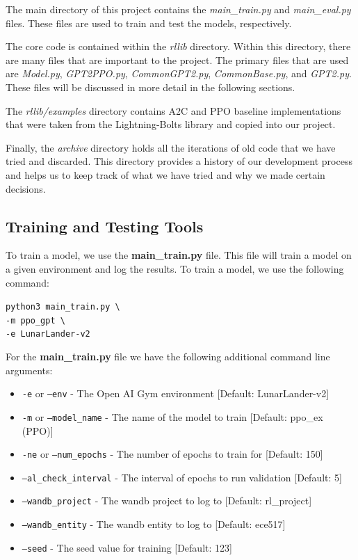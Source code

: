 \documentclass[conference]{IEEEtran}
\begin{document}
The main directory of this project contains the \textit{main\_train.py} and \textit{main\_eval.py} files. These files are used to train and test the models, respectively.

The core code is contained within the \textit{rllib} directory. Within this directory, there are many files that are important to the project. The primary files that are used are \textit{Model.py}, \textit{GPT2PPO.py}, \textit{CommonGPT2.py}, \textit{CommonBase.py}, and \textit{GPT2.py}. These files will be discussed in more detail in the following sections.

The \textit{rllib/examples} directory contains A2C and PPO baseline implementations that were taken from the Lightning-Bolts library and copied into our project.

Finally, the \textit{archive} directory holds all the iterations of old code that we have tried and discarded. This directory provides a history of our development process and helps us to keep track of what we have tried and why we made certain decisions.


\subsection{Training and Testing Tools}
To train a model, we use the \textbf{main\_train.py} file. This file will train a model on a given environment and log the results.
To train a model, we use the following command:
\begin{center}
    \texttt{python3 main\_train.py \textbackslash \\}
    \texttt{-m ppo\_gpt \textbackslash \\}
    \texttt{-e LunarLander-v2}
\end{center}

For the \textbf{main\_train.py} file we have the following additional command line arguments:
\begin{itemize}
    \item \texttt{-e} or \texttt{--env} - The Open AI Gym environment [Default: LunarLander-v2]
    \item \texttt{-m} or \texttt{--model\_name} - The name of the model to train [Default: ppo\_ex (PPO)]
    \item \texttt{-ne} or \texttt{--num\_epochs} - The number of epochs to train for [Default: 150]
    \item \texttt{--al\_check\_interval} - The interval of epochs to run validation [Default: 5]
    \item \texttt{--wandb\_project} - The wandb project to log to [Default: rl\_project]
    \item \texttt{--wandb\_entity} - The wandb entity to log to [Default: ece517]
    \item \texttt{--seed} - The seed value for training [Default: 123]
\end{itemize}
\end{document}
